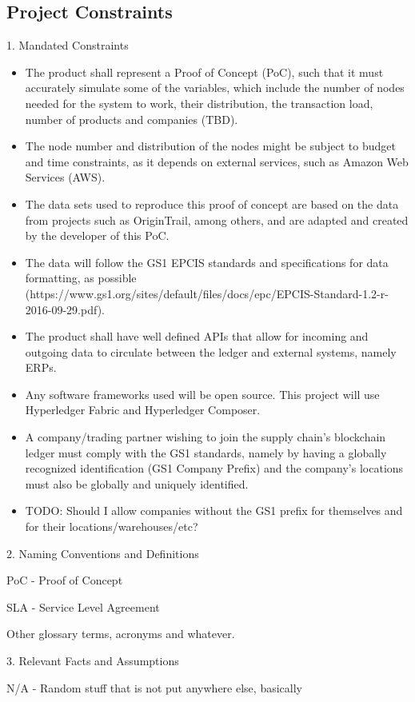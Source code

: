 \subsection{Project Constraints}

	1. Mandated Constraints
    \begin{itemize}
		\item The product shall represent a Proof of Concept (PoC), such that it must accurately simulate some of the variables, which include the number of nodes needed for the system to work, their distribution, the transaction load, number of products and companies (TBD).
		\item The node number and distribution of the nodes might be subject to budget and time constraints, as it depends on external services, such as Amazon Web Services (AWS).
		\item The data sets used to reproduce this proof of concept are based on the data from projects such as OriginTrail, among others, and are adapted and created by the developer of this PoC.
		\item The data will follow the GS1 EPCIS standards and specifications for data formatting, as possible (https://www.gs1.org/sites/default/files/docs/epc/EPCIS-Standard-1.2-r-2016-09-29.pdf).
		\item The product shall have well defined APIs that allow for incoming and outgoing data to circulate between the ledger and external systems, namely ERPs.
		\item Any software frameworks used will be open source. This project will use Hyperledger Fabric and Hyperledger Composer.
		\item A company/trading partner wishing to join the supply chain's blockchain ledger must comply with the GS1 standards, namely by having a globally recognized identification (GS1 Company Prefix) and the company's locations must also be globally and uniquely identified.
		\item TODO: Should I allow companies without the GS1 prefix for themselves and for their locations/warehouses/etc? 
        \end{itemize}
	2. Naming Conventions and Definitions
		\par PoC - Proof of Concept
		\par SLA - Service Level Agreement
		\par Other glossary terms, acronyms and whatever.
		
	3. Relevant Facts and Assumptions
		\par N/A - Random stuff that is not put anywhere else, basically
	
